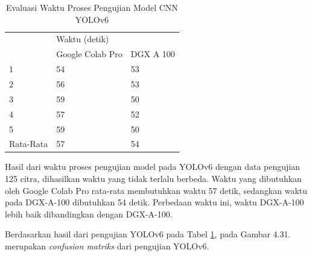 \begin{singlespace}
	\begin{table}[H]
		\centering
		\caption{Evaluasi Waktu Proses Pengujian Model CNN YOLOv6}
		\label{tbl:Evaluasi-Waktu-Proses-Pengujian-Model-CNN-YOLOv6}
		\begin{tabular}{|l|ll|}
			\hline
			\rowcolor[HTML]{D9D9D9} 
			\cellcolor[HTML]{D9D9D9}                       & \multicolumn{2}{l|}{\cellcolor[HTML]{D9D9D9}Waktu (detik)}                \\ \cline{2-3} 
			\rowcolor[HTML]{D9D9D9} 
			\multirow{-2}{*}{\cellcolor[HTML]{D9D9D9}Fold} & \multicolumn{1}{l|}{\cellcolor[HTML]{D9D9D9}Google Colab Pro} & DGX A 100 \\ \hline
			1                                              & \multicolumn{1}{l|}{54}                                      & 53        \\ \hline
			2                                              & \multicolumn{1}{l|}{56}                                      & 53        \\ \hline
			3                                              & \multicolumn{1}{l|}{59}                                      & 50        \\ \hline
			4                                              & \multicolumn{1}{l|}{57}                                      & 52        \\ \hline
			5                                              & \multicolumn{1}{l|}{59}                                      & 50        \\ \hline
			Rata-Rata                                      & \multicolumn{1}{l|}{57}                                      & 54        \\ \hline
		\end{tabular}
	\end{table}
\end{singlespace}

Hasil dari waktu proses pengujian model pada YOLOv6 dengan data pengujian 125 citra, dihasilkan waktu yang tidak terlalu berbeda. Waktu yang dibutuhkan oleh Google Colab Pro rata-rata membutuhkan waktu 57 detik, sedangkan waktu pada DGX-A-100 dibutuhkan 54 detik. Perbedaan waktu ini, waktu DGX-A-100 lebih baik dibandingkan dengan DGX-A-100.

Berdasarkan hasil dari pengujian YOLOv6 pada Tabel \ref{tbl:Evaluasi-Waktu-Proses-Pengujian-Model-CNN-YOLOv6}, pada Gambar 4.31. merupakan \textit{confusion matriks} dari pengujian YOLOv6.


